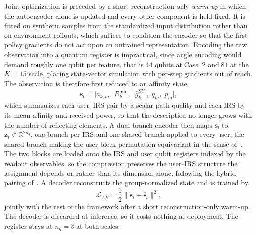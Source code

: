 \documentclass[12pt,onecolumn]{IEEEtran}
\begin{document}
Joint optimization is preceded by a short reconstruction-only \emph{warm-up} in which the autoencoder alone is updated and every other component is held fixed.
It is fitted on synthetic samples from the standardized input distribution rather than on environment rollouts, which suffices to condition the encoder so that the first policy gradients do not act upon an untrained representation.
\else
Encoding the raw observation into a quantum register is impractical, since angle encoding
would demand roughly one qubit per feature, that is $44$ qubits at Case~2 and $81$ at the
$K{=}15$ scale, placing state-vector simulation with per-step gradients out of reach. The
observation is therefore first reduced to an affinity state
\begin{equation}
    \mathbf{s}_t
    =
    \bigl[ a_{k,m}, \; R_k^{\min},\; |\hat{g}^{SU}_k|,\; q_m,\; p_m \bigr],
    \label{eq:affinity}
\end{equation}
which summarizes each user--IRS pair by a scalar path quality and each IRS by its mean
affinity and received power, so that the description no longer grows with the number of
reflecting elements. A dual-branch encoder then maps $\mathbf{s}_t$ to
$\mathbf{z}_t\in\mathbb{R}^{2n_q}$, one branch per IRS and one shared branch applied to
every user, the shared branch making the user block permutation-equivariant in the sense
of~\cite{zaheer2017deep}. The two blocks are loaded onto the IRS and user qubit registers
indexed by the readout observables, so the compression preserves the user--IRS structure
the assignment depends on rather than its dimension alone, following the hybrid pairing
of~\cite{nagy2025hybrid}. A decoder reconstructs the group-normalized state and is trained
by
\begin{equation}
    \mathcal{L}_{AE} = \frac{1}{2} \bigl\|\hat{\mathbf{s}}_t - \bar{\mathbf{s}}_t\bigr\|^2,
    \label{eq:ae_loss}
\end{equation}
jointly with the rest of the framework after a short reconstruction-only warm-up. The
decoder is discarded at inference, so it costs nothing at deployment. The register stays
at $n_q{=}8$ at both scales.
\fi
\end{document}

